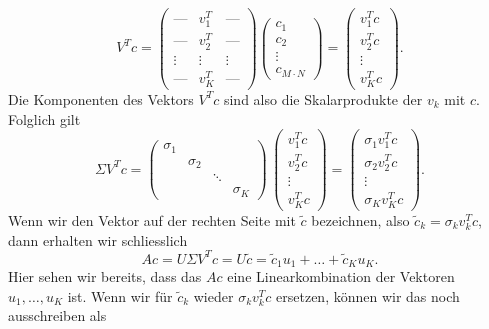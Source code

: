 \begin{equation*}
	V^Tc=
	\begin{pmatrix}
		\text{---} & v_1^T & \text{---} \\
		\text{---} & v_2^T & \text{---} \\
		\vdots & \vdots & \vdots \\
		\text{---} & v_K^T & \text{---}
	\end{pmatrix}
	\begin{pmatrix}
		c_1 \\
		c_2 \\
		\vdots \\
		c_{M\cdot N}
	\end{pmatrix}=
	\begin{pmatrix}
		v_1^T c \\
		v_2^T c \\
		\vdots \\
		v_K^T c
	\end{pmatrix}.
\end{equation*}
Die Komponenten des Vektors $V^Tc$ sind also die Skalarprodukte der $v_k$ mit $c$.
Folglich gilt
\begin{equation*}
	\Sigma V^Tc=
	\begin{pmatrix}
		\sigma_1 & & & \\
		& \sigma_2 & & \\
		& & \ddots & \\
		& & & \sigma_K
	\end{pmatrix}\,
	\begin{pmatrix}
		v_1^T c \\
		v_2^T c \\
		\vdots \\
		v_K^T c
	\end{pmatrix}=
	\begin{pmatrix}
		\sigma_1 v_1^T c \\
		\sigma_2 v_2^T c \\
		\vdots \\
		\sigma_K v_K^T c
	\end{pmatrix}.
\end{equation*}
Wenn wir den Vektor auf der rechten Seite mit $\tilde c$ bezeichnen, also $\tilde c_k=\sigma_k v_k^T c$, dann erhalten wir schliesslich
\begin{equation*}
	Ac = U\Sigma V^Tc=U\tilde c
	=\tilde c_1 u_1+\ldots+\tilde c_K u_K.
\end{equation*}
Hier sehen wir bereits, dass das $Ac$ eine Linearkombination der Vektoren $u_1,\ldots,u_K$ ist.
Wenn wir für $\tilde c_k$ wieder $\sigma_k v_k^T c$ ersetzen, können wir das noch ausschreiben als
